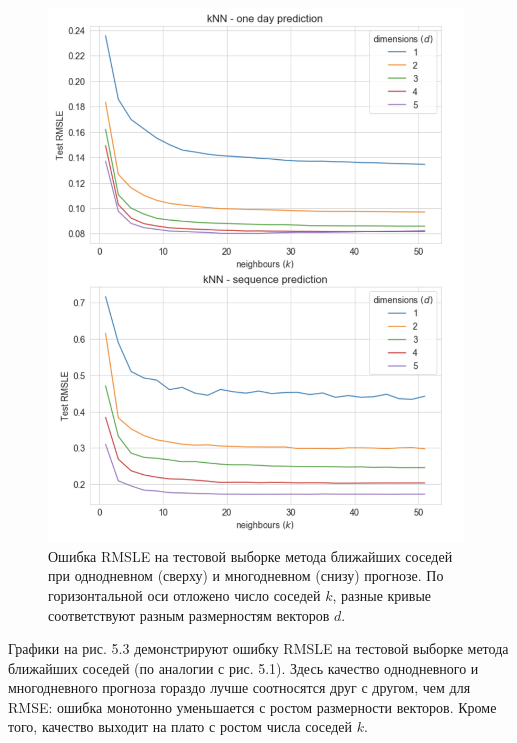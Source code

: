 \documentclass[a4paper, 12pt]{article}
\begin{document}
\begin{figure}[H]
    \centering
    \includegraphics[width=11cm]{knn_rmsle.png}
    \caption{Ошибка RMSLE на тестовой выборке метода ближайших соседей при однодневном (сверху) и многодневном (снизу) прогнозе. По горизонтальной оси отложено число соседей $k$, разные кривые соответствуют разным размерностям векторов $d$.}
    \label{fig:my_label}
\end{figure}{}

Графики на рис. 5.3 демонстрируют ошибку RMSLE на тестовой выборке метода ближайших соседей (по аналогии с рис. 5.1). Здесь качество однодневного и многодневного прогноза гораздо лучше соотносятся друг с другом, чем для RMSE: ошибка монотонно уменьшается с ростом размерности векторов. Кроме того, качество выходит на плато с ростом числа соседей $k$.
\end{document}
